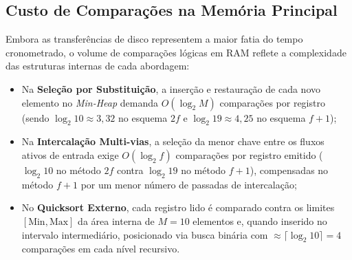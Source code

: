 \documentclass[12pt,a4paper]{article}
\begin{document}
\subsection{Custo de Comparações na Memória Principal}
Embora as transferências de disco representem a maior fatia do tempo cronometrado, o volume de comparações lógicas em RAM reflete a complexidade das estruturas internas de cada abordagem:
\begin{itemize}
    \item Na \textbf{Seleção por Substituição}, a inserção e restauração de cada novo elemento no \textit{Min-Heap} demanda $O(\log_2 M)$ comparações por registro (sendo $\log_2 10 \approx 3{,}32$ no esquema $2f$ e $\log_2 19 \approx 4{,}25$ no esquema $f+1$);
    \item Na \textbf{Intercalação Multi-vias}, a seleção da menor chave entre os fluxos ativos de entrada exige $O(\log_2 f)$ comparações por registro emitido ($\log_2 10$ no método $2f$ contra $\log_2 19$ no método $f+1$), compensadas no método $f+1$ por um menor número de passadas de intercalação;
    \item No \textbf{Quicksort Externo}, cada registro lido é comparado contra os limites $[\text{Min}, \text{Max}]$ da área interna de $M = 10$ elementos e, quando inserido no intervalo intermediário, posicionado via busca binária com $\approx \lceil \log_2 10 \rceil = 4$ comparações em cada nível recursivo.
\end{itemize}
\end{document}
